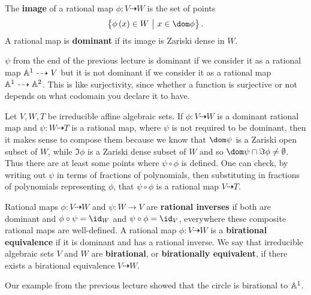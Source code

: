 \begin{definition*}
The \textbf{image} of a rational map $ \phi : V \dashrightarrow W $ is the set of points
$$ \cbr{\phi\br{x} \in W \st x \in \dom \phi}. $$
A rational map is \textbf{dominant} if its image is Zariski dense in $ W $.
\end{definition*}

\begin{example*}
$ \psi $ from the end of the previous lecture is dominant if we consider it as a rational map $ \AA^1 \dashrightarrow V $ but it is not dominant if we consider it as a rational map $ \AA^1 \dashrightarrow \AA^2 $. This is like surjectivity, since whether a function is surjective or not depends on what codomain you declare it to have.
\end{example*}

Let $ V, W, T $ be irreducible affine algebraic sets. If $ \phi : V \dashrightarrow W $ is a dominant rational map and $ \psi : W \dashrightarrow T $ is a rational map, where $ \psi $ is not required to be dominant, then it makes sense to compose them because we know that $ \dom \psi $ is a Zariski open subset of $ W $, while $ \Im \phi $ is a Zariski dense subset of $ W $ and so $ \dom \psi \cap \Im \phi \ne \emptyset $. Thus there are at least some points where $ \psi \circ \phi $ is defined. One can check, by writing out $ \psi $ in terms of fractions of polynomials, then substituting in fractions of polynomials representing $ \phi $, that $ \psi \circ \phi $ is a rational map $ V \dashrightarrow T $.

\begin{definition*}
Rational maps $ \phi : V \dashrightarrow W $ and $ \psi : W \to V $ are \textbf{rational inverses} if both are dominant and $ \phi \circ \psi = \id_W $ and $ \psi \circ \phi = \id_V $, everywhere these composite rational maps are well-defined. A rational map $ \phi : V \dashrightarrow W $ is a \textbf{birational equivalence} if it is dominant and has a rational inverse. We say that irreducible algebraic sets $ V $ and $ W $ are \textbf{birational}, or \textbf{birationally equivalent}, if there exists a birational equivalence $ V \dashrightarrow W $.
\end{definition*}

\begin{example*}
Our example from the previous lecture showed that the circle is birational to $ \AA^1 $.
\end{example*}

\pagebreak

